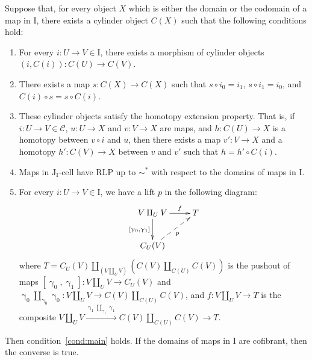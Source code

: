 \documentclass{tac}
\theoremstyle{definition}
\newcommand{\cof}{\mathcal{C}}
\newcommand{\I}{\mathrm{I}}
\newcommand{\J}{\mathrm{J}}
\newcommand{\class}[2]{#1\text{-}\mathrm{#2}}
\newcommand{\Icell}[1][\I]{\class{#1}{cell}}
\newcommand{\Jcell}[1][]{\Icell[\J#1]}
\newcommand{\cyli}{\upgamma}
\begin{document}
\begin{prop}
Suppose that, for every object $X$ which is either the domain or the codomain of a map in $\I$,
there exists a cylinder object $C(X)$ such that the following conditions hold:
\begin{enumerate}
\item \label{it:cyl-func} For every $i : U \to V \in \I$, there exists a morphism of cylinder objects $(i,C(i)) : C(U) \to C(V)$.
\item There exists a map $s : C(X) \to C(X)$ such that $s \circ i_0 = i_1$, $s \circ i_1 = i_0$, and $C(i) \circ s = s \circ C(i)$.
\item These cylinder objects satisfy the homotopy extension property. That is,
if $i : U \to V \in \cof$, $u : U \to X$ and $v : V \to X$ are maps, and $h : C(U) \to X$ is a homotopy between $v \circ i$ and $u$,
then there exists a map $v' : V \to X$ and a homotopy $h' : C(V) \to X$ between $v$ and $v'$ such that $h = h' \circ C(i)$.
\item \label{it:cyl-hom} Maps in $\Jcell[_\I]$ have RLP up to $\sim^*$ with respect to the domains of maps in $\I$.
\item \label{it:cyl-cyl} For every $i : U \to V \in \I$, we have a lift $p$ in the following diagram:
\[ \xymatrix{ V \amalg_U V \ar[r]^-f \ar[d]_{[\cyli_0,\cyli_1]} & T \\
              C_U(V) \ar@{-->}[ur]_p
            } \]
where $T = C_U(V) \amalg_{(V \amalg_U V)} (C(V) \amalg_{C(U)} C(V))$ is the pushout of maps $[\cyli_0,\cyli_1] : V \amalg_U V \to C_U(V)$
and $\cyli_0 \amalg_{\cyli_0} \cyli_0 : V \amalg_U V \to C(V) \amalg_{C(U)} C(V)$,
and $f : V \amalg_U V \to T$ is the composite $V \amalg_U V \xrightarrow{\cyli_1 \amalg_{\cyli_1} \cyli_1} C(V) \amalg_{C(U)} C(V) \to T$.
\end{enumerate}
Then condition~\eqref{cond:main} holds.
If the domains of maps in $\I$ are cofibrant, then the converse is true.
\end{prop}
\end{document}

